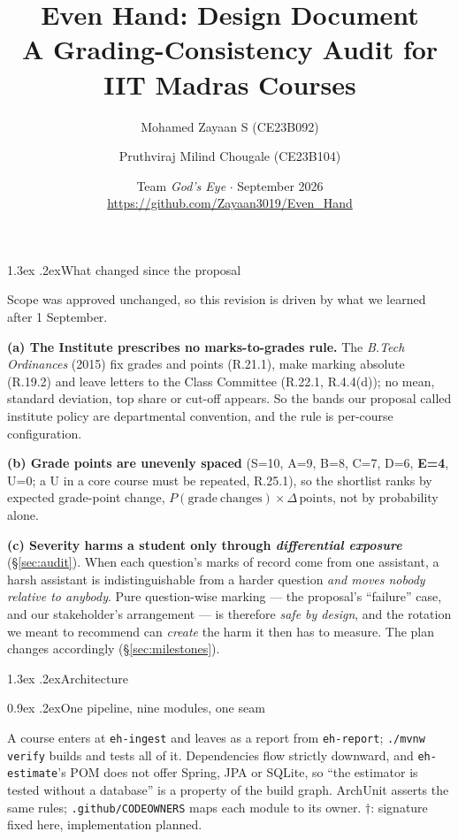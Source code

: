 \documentclass[10pt,a4paper]{article}
\title{\vspace{-1.2cm}\textbf{Even Hand: Design Document}\\[4pt]
\large A Grading-Consistency Audit for IIT Madras Courses}
\author{Mohamed Zayaan S (CE23B092) \and Pruthviraj Milind Chougale (CE23B104)}
\date{Team \emph{God's Eye} \quad$\cdot$\quad 11 September 2026 \\[3pt]
\url{https://github.com/Zayaan3019/Even_Hand}}
\makeatletter
\renewcommand\section{\@startsection{section}{1}{\z@}{-2.8ex \@plus -.6ex \@minus -.2ex}%
  {1.3ex \@plus .2ex}{\normalfont\Large\bfseries}}
\renewcommand\subsection{\@startsection{subsection}{2}{\z@}{-2.4ex \@plus -.5ex \@minus -.2ex}%
  {0.9ex \@plus .2ex}{\normalfont\large\bfseries}}
\makeatother
\begin{document}
\maketitle

\section{What changed since the proposal}

Scope was approved unchanged, so this revision is driven by what we learned after 1 September.

\textbf{(a) The Institute prescribes no marks-to-grades rule.} The \emph{B.Tech Ordinances} (2015)
fix grades and points (R.21.1), make marking absolute (R.19.2) and leave letters to the Class
Committee (R.22.1, R.4.4(d)); no mean, standard deviation, top share or cut-off appears. So the
bands our proposal called institute policy are departmental convention, and the rule is per-course
configuration.

\textbf{(b) Grade points are unevenly spaced} (S=10, A=9, B=8, C=7, D=6, \textbf{E=4}, U=0; a U in
a core course must be repeated, R.25.1), so the shortlist ranks by expected grade-point change,
$P(\mathrm{grade\ changes})\times\Delta\,\mathrm{points}$, not by probability alone.

\textbf{(c) Severity harms a student only through \emph{differential exposure}}
(\S\ref{sec:audit}). When each question's marks of record come from one assistant, a harsh assistant
is indistinguishable from a harder question \emph{and moves nobody relative to anybody}. Pure
question-wise marking --- the proposal's ``failure'' case, and our stakeholder's arrangement --- is
therefore \emph{safe by design}, and the rotation we meant to recommend can \emph{create} the harm it
then has to measure. The plan changes accordingly (\S\ref{sec:milestones}).

\section{Architecture}

\subsection{One pipeline, nine modules, one seam}

A course enters at \texttt{eh-ingest} and leaves as a report from \texttt{eh-report};
\texttt{./mvnw verify} builds and tests all of it. Dependencies flow strictly downward, and
\texttt{eh-estimate}'s POM does not offer Spring, JPA or SQLite, so ``the estimator is tested
without a database'' is a property of the build graph. ArchUnit asserts the same rules;
\texttt{.github/CODEOWNERS} maps each module to its owner. $\dagger$: signature fixed here,
implementation planned.
\end{document}
